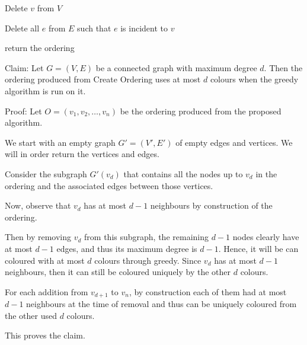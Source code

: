 \begin{soln}
\begin{algorithmic}[1]
		\State Delete $v$ from $V$

		\State Delete all $e$ from $E$ such that $e$ is incident to $v$

		\EndWhile

		\State return the ordering

		\EndProcedure

	\end{algorithmic}

	Claim: Let \(G = (V, E)\) be a connected graph with maximum degree \(d\). Then the ordering produced from Create Ordering uses at most \(d\) colours when the greedy algorithm is run on it.

	Proof: Let \(O = (v_1, v_2, \dots, v_n)\) be the ordering produced from the proposed algorithm.

	We start with an empty graph \(G' = (V', E')\) of empty edges and vertices. We will in order return the vertices and edges.

	Consider the subgraph \(G'(v_d)\) that contains all the nodes up to \(v_d\) in the ordering and the associated edges between those vertices.

	Now, observe that \(v_d\) has at most \(d - 1\) neighbours by construction of the ordering.

	Then by removing \(v_d\) from this subgraph, the remaining \(d - 1\) nodes clearly have at most \(d - 1\) edges, and thus its maximum degree is \(d - 1\).
	Hence, it will be can coloured with at most \(d\) colours through greedy. Since \(v_d\) has at most \(d - 1\) neighbours, then it can still be coloured uniquely by the other \(d\) colours.

	For each addition from \(v_{d+1}\) to \(v_{n}\), by construction each of them had at most \(d - 1\) neighbours at the time of removal and thus can be uniquely coloured from the other used \(d\) colours.

	This proves the claim.
\end{soln}
